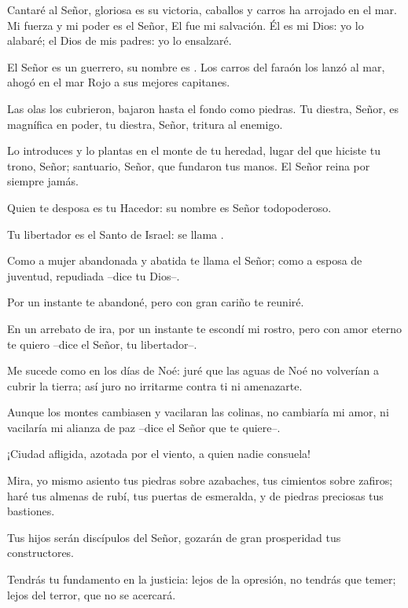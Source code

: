 
 


\begin{psbody}
Cantaré al Señor, gloriosa es su victoria, 
caballos y carros ha arrojado en el mar. 
Mi fuerza y mi poder es el Señor, 
El fue mi salvación. 
Él es mi Dios: yo lo alabaré; 
el Dios de mis padres: yo lo ensalzaré. 

El Señor es un guerrero, 
su nombre es . 
Los carros del faraón los lanzó al mar, 
ahogó en el mar Rojo a sus mejores capitanes. 

Las olas los cubrieron, 
bajaron hasta el fondo como piedras. 
Tu diestra, Señor, es magnífica en poder, 
tu diestra, Señor, tritura al enemigo. 

Lo introduces y lo plantas en el monte de tu heredad, 
lugar del que hiciste tu trono, Señor; 
santuario, Señor, que fundaron tus manos. 
El Señor reina por siempre jamás. 
\end{psbody}


 


\begin{readprose}
Quien te desposa es tu Hacedor: 
   su nombre es Señor todopoderoso. 

Tu libertador es el Santo de Israel: 
   se llama . 

Como a mujer abandonada y abatida 
   te llama el Señor; 
   como a esposa de juventud, repudiada 
   –dice tu Dios–. 

Por un instante te abandoné, 
   pero con gran cariño te reuniré. 

En un arrebato de ira, 
   por un instante te escondí mi rostro, 
   pero con amor eterno te quiero 
   –dice el Señor, tu libertador–. 

Me sucede como en los días de Noé: 
   juré que las aguas de Noé 
   no volverían a cubrir la tierra; 
   así juro no irritarme contra ti 
   ni amenazarte. 

Aunque los montes cambiasen 
   y vacilaran las colinas, 
   no cambiaría mi amor, 
   ni vacilaría mi alianza de paz 
   –dice el Señor que te quiere–. 

¡Ciudad afligida, azotada por el viento, 
   a quien nadie consuela! 

Mira, yo mismo asiento tus piedras sobre azabaches, 
   tus cimientos sobre zafiros; 
   haré tus almenas de rubí, 
   tus puertas de esmeralda, 
   y de piedras preciosas tus bastiones. 

Tus hijos serán discípulos del Señor, 
   gozarán de gran prosperidad tus constructores. 

Tendrás tu fundamento en la justicia: 
   lejos de la opresión, no tendrás que temer; 
   lejos del terror, que no se acercará.
\end{readprose}


